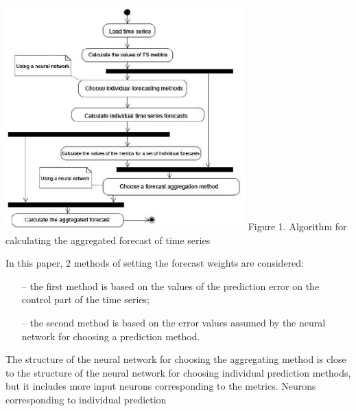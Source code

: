 \documentclass{article}
\begin{document}
\begin{multicols}{2}
\includegraphics{pivo3}
\small Figure 1. Algorithm for calculating the aggregated forecast of time
series
\par In this paper, 2 methods of setting the forecast weights
are considered:
\begin{itemize}[noitemsep]
    \item [--] the first method is based on the values of the
prediction error on the control part of the time
series;
    \item [--] the second method is based on the error values
assumed by the neural network for choosing a
prediction method.
\end{itemize}
The structure of the neural network for choosing the
aggregating method is close to the structure of the neural
network for choosing individual prediction methods, but
it includes more input neurons corresponding to the
metrics. Neurons corresponding to individual prediction

\end{multicols}
\end{document}

